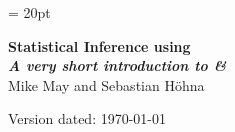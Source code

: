 \documentclass[11pt]{article}
\begin{document}
\renewcommand{\headrulewidth}{0.5pt}
\headsep = 20pt
\lhead{ }

\thispagestyle{plain}
\begin{center}

\textbf{\LARGE Statistical Inference using \RevBayes}\\\vspace{2mm}
\textbf{\it{\Large A very short introduction to \RevBayes \& \Rev}}\\\vspace{2mm}
\vspace{1cm}
{\Large Mike May and Sebastian H{\"o}hna}
\vspace{1cm}
\end{center}

\def \ResourcePath {./}
\def \GlobalResourcePath {../}



Version dated: \today
\end{document}
